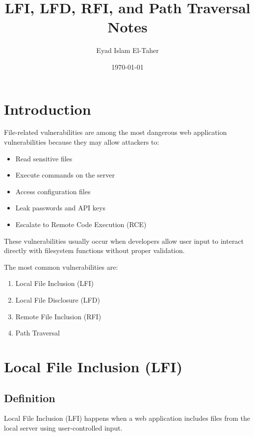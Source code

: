 \documentclass[12pt]{article}
\title{LFI, LFD, RFI, and Path Traversal Notes}
\author{Eyad Islam El-Taher}
\date{\today}
\begin{document}
\maketitle
\tableofcontents
\newpage

\section{Introduction}

File-related vulnerabilities are among the most dangerous web application vulnerabilities because they may allow attackers to:

\begin{itemize}
    \item Read sensitive files
    \item Execute commands on the server
    \item Access configuration files
    \item Leak passwords and API keys
    \item Escalate to Remote Code Execution (RCE)
\end{itemize}

These vulnerabilities usually occur when developers allow user input to interact directly with filesystem functions without proper validation.

The most common vulnerabilities are:

\begin{enumerate}
    \item Local File Inclusion (LFI)
    \item Local File Disclosure (LFD)
    \item Remote File Inclusion (RFI)
    \item Path Traversal
\end{enumerate}

\section{Local File Inclusion (LFI)}

\subsection{Definition}

Local File Inclusion (LFI) happens when a web application includes files from the local server using user-controlled input.
\end{document}
